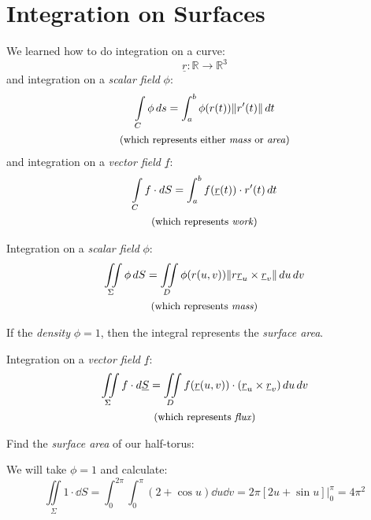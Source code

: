 \documentclass[00_complete]{sub files}
\begin{document}
\section{Integration on Surfaces}
\begin{reminder}
    We learned how to do integration on a curve:
    $$\underline r: \mathbb{R} \to \mathbb{R}^3$$
    and integration on a \emph{scalar field} $\phi$:
    \begin{gather*}
    \int\limits_C\phi\dd{s}=\int_{a}^{b}\phi(r(t))\|r'(t)\|\dd{t} \\
    \text{\small (which represents either \emph{mass} or \emph{area})}
    \end{gather*}
    and integration on a \emph{vector field} $\underline f$:
    \begin{gather*}
    \int\limits_Cf\cdot \dd{S}=\int_{a}^{b}f(\underline r(t))\cdot r'(t)\dd{t}
    \\
    \text{\small (which represents \emph{work})}
    \end{gather*}
\end{reminder}
Integration on a \emph{scalar field} $\phi$:
\begin{gather*}
\iint\limits_\Sigma \phi \dd{S} = \iint\limits_D \phi(r(u,v))\|r\underline
r_u \times \underline r_v\|\dd{u}\dd{v} \\
\text{\small (which represents \emph{mass})}
\end{gather*}
\begin{note}
    If the \emph{density} $\phi=1$, then the integral represents the
    \emph{surface area}.
\end{note}
Integration on a \emph{vector field} $\underline f$:
\begin{gather*}
\iint\limits_\Sigma f \cdot \dd{\underline S} = \iint\limits_D f(\underline
r(u,v))\cdot (\underline r_u \times \underline r_v)\dd{u}\dd{v} \\
\text{\small (which represents \emph{flux})}
\end{gather*}
\begin{example}
    Find the \emph{surface area} of our half-torus:

    We will take $\phi=1$ and calculate:
    $$\iint\limits_\Sigma 1 \cdot \dd{S}=\int_{0}^{2\pi}\int_{0}^{\pi}(2+\cos
    u)\dd{u}\dd{v}=2\pi[2u+\sin u]\Bigr|_0^\pi=4\pi^2$$
\end{example}
\end{document}
